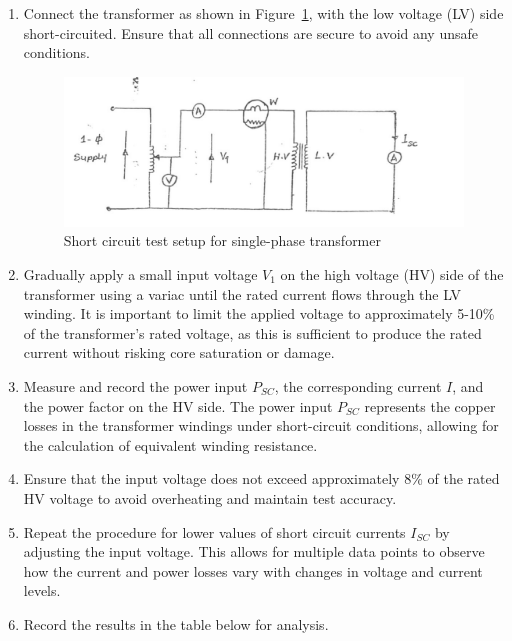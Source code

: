 \documentclass[12pt,a4paper]{report}
\begin{document}
\begin{enumerate}
    \item Connect the transformer as shown in Figure~\ref{fig_4}, with the low voltage (LV) side short-circuited. Ensure that all connections are secure to avoid any unsafe conditions.

    \begin{figure}[H]
        \centering
        \includegraphics[width=0.8\linewidth]{figure_4_4.jpeg}
        \caption{Short circuit test setup for single-phase transformer}
        \label{fig_4}
    \end{figure}
    
    \item Gradually apply a small input voltage \( V_{1} \) on the high voltage (HV) side of the transformer using a variac until the rated current flows through the LV winding. It is important to limit the applied voltage to approximately 5-10\% of the transformer's rated voltage, as this is sufficient to produce the rated current without risking core saturation or damage.
    
    \item Measure and record the power input \( P_{SC} \), the corresponding current \( I \), and the power factor on the HV side. The power input \( P_{SC} \) represents the copper losses in the transformer windings under short-circuit conditions, allowing for the calculation of equivalent winding resistance.
    
    \item Ensure that the input voltage does not exceed approximately 8\% of the rated HV voltage to avoid overheating and maintain test accuracy.
    
    \item Repeat the procedure for lower values of short circuit currents \( I_{SC} \) by adjusting the input voltage. This allows for multiple data points to observe how the current and power losses vary with changes in voltage and current levels.
    
    \item Record the results in the table below for analysis.


\end{enumerate}
\end{document}
